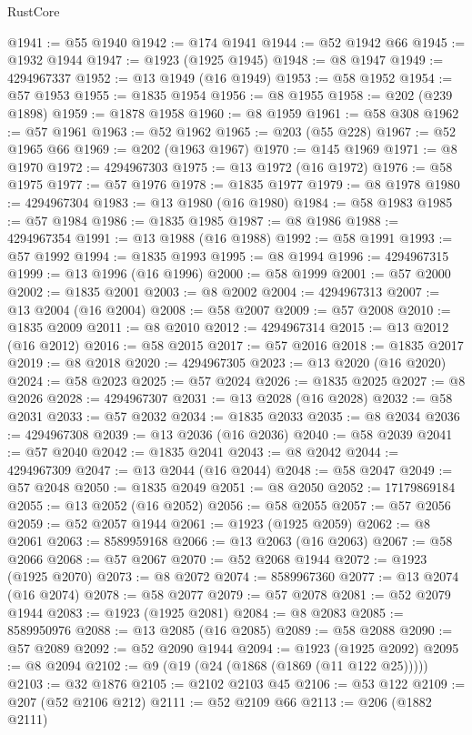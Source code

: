 \begin{lexlean}{RustCore}
\begin{coremodule}
@1941 := @55 @1940
@1942 := @174 @1941
@1944 := @52 @1942 @66
@1945 := @1932 @1944
@1947 := @1923 (@1925 @1945)
@1948 := @8 @1947
@1949 := 4294967337
@1952 := @13 @1949 (@16 @1949)
@1953 := @58 @1952
@1954 := @57 @1953
@1955 := @1835 @1954
@1956 := @8 @1955
@1958 := @202 (@239 @1898)
@1959 := @1878 @1958
@1960 := @8 @1959
@1961 := @58 @308
@1962 := @57 @1961
@1963 := @52 @1962
@1965 := @203 (@55 @228)
@1967 := @52 @1965 @66
@1969 := @202 (@1963 @1967)
@1970 := @145 @1969
@1971 := @8 @1970
@1972 := 4294967303
@1975 := @13 @1972 (@16 @1972)
@1976 := @58 @1975
@1977 := @57 @1976
@1978 := @1835 @1977
@1979 := @8 @1978
@1980 := 4294967304
@1983 := @13 @1980 (@16 @1980)
@1984 := @58 @1983
@1985 := @57 @1984
@1986 := @1835 @1985
@1987 := @8 @1986
@1988 := 4294967354
@1991 := @13 @1988 (@16 @1988)
@1992 := @58 @1991
@1993 := @57 @1992
@1994 := @1835 @1993
@1995 := @8 @1994
@1996 := 4294967315
@1999 := @13 @1996 (@16 @1996)
@2000 := @58 @1999
@2001 := @57 @2000
@2002 := @1835 @2001
@2003 := @8 @2002
@2004 := 4294967313
@2007 := @13 @2004 (@16 @2004)
@2008 := @58 @2007
@2009 := @57 @2008
@2010 := @1835 @2009
@2011 := @8 @2010
@2012 := 4294967314
@2015 := @13 @2012 (@16 @2012)
@2016 := @58 @2015
@2017 := @57 @2016
@2018 := @1835 @2017
@2019 := @8 @2018
@2020 := 4294967305
@2023 := @13 @2020 (@16 @2020)
@2024 := @58 @2023
@2025 := @57 @2024
@2026 := @1835 @2025
@2027 := @8 @2026
@2028 := 4294967307
@2031 := @13 @2028 (@16 @2028)
@2032 := @58 @2031
@2033 := @57 @2032
@2034 := @1835 @2033
@2035 := @8 @2034
@2036 := 4294967308
@2039 := @13 @2036 (@16 @2036)
@2040 := @58 @2039
@2041 := @57 @2040
@2042 := @1835 @2041
@2043 := @8 @2042
@2044 := 4294967309
@2047 := @13 @2044 (@16 @2044)
@2048 := @58 @2047
@2049 := @57 @2048
@2050 := @1835 @2049
@2051 := @8 @2050
@2052 := 17179869184
@2055 := @13 @2052 (@16 @2052)
@2056 := @58 @2055
@2057 := @57 @2056
@2059 := @52 @2057 @1944
@2061 := @1923 (@1925 @2059)
@2062 := @8 @2061
@2063 := 8589959168
@2066 := @13 @2063 (@16 @2063)
@2067 := @58 @2066
@2068 := @57 @2067
@2070 := @52 @2068 @1944
@2072 := @1923 (@1925 @2070)
@2073 := @8 @2072
@2074 := 8589967360
@2077 := @13 @2074 (@16 @2074)
@2078 := @58 @2077
@2079 := @57 @2078
@2081 := @52 @2079 @1944
@2083 := @1923 (@1925 @2081)
@2084 := @8 @2083
@2085 := 8589950976
@2088 := @13 @2085 (@16 @2085)
@2089 := @58 @2088
@2090 := @57 @2089
@2092 := @52 @2090 @1944
@2094 := @1923 (@1925 @2092)
@2095 := @8 @2094
@2102 := @9 (@19 (@24 (@1868 (@1869 (@11 @122 @25)))))
@2103 := @32 @1876
@2105 := @2102 @2103 @45
@2106 := @53 @122
@2109 := @207 (@52 @2106 @212)
@2111 := @52 @2109 @66
@2113 := @206 (@1882 @2111)

\end{coremodule}
\end{lexlean}
